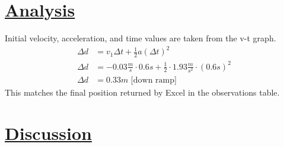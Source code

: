 \documentclass[letterpaper,12pt]{article}
\begin{document}
\section*{\underline{Analysis}}
Initial velocity, acceleration, and time values are taken from the v-t graph.
\begin{align*}
    \Delta d&=v_1\Delta t+\frac{1}{2}a(\Delta t)^2\\
    \Delta d&=-0.03\frac{m}{s}\cdot0.6s+\frac{1}{2}\cdot1.93\frac{m}{s^2}\cdot(0.6s)^2\\
    \Delta d&=0.33m\text{ [down ramp]}
\end{align*}
This matches the final position returned by Excel in the observations table.

\section*{\underline{Discussion}}
\end{document}
